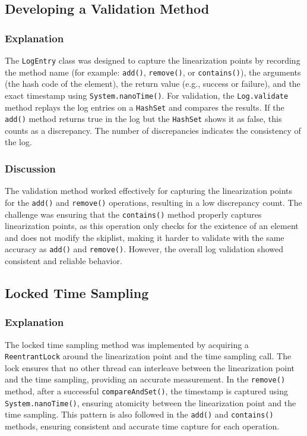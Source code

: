 \documentclass{article}
\begin{document}
\newpage
\subsection{Developing a Validation Method}

\subsubsection{Explanation}
The \texttt{LogEntry} class was designed to capture the linearization points by recording the method name (for example: \texttt{add()}, \texttt{remove()}, or \texttt{contains()}), the arguments (the hash code of the element), the return value (e.g., success or failure), and the exact timestamp using \texttt{System.nanoTime()}. For validation, the \texttt{Log.validate} method replays the log entries on a \texttt{HashSet} and compares the results. If the \texttt{add()} method returns true in the log but the \texttt{HashSet} shows it as false, this counts as a discrepancy. The number of discrepancies indicates the consistency of the log.

\subsubsection{Discussion}
The validation method worked effectively for capturing the linearization points for the \texttt{add()} and \texttt{remove()} operations, resulting in a low discrepancy count. The challenge was ensuring that the \texttt{contains()} method properly captures linearization points, as this operation only checks for the existence of an element and does not modify the skiplist, making it harder to validate with the same accuracy as \texttt{add()} and \texttt{remove()}. However, the overall log validation showed consistent and reliable behavior.

\newpage
\subsection{Locked Time Sampling}

\subsubsection{Explanation}
The locked time sampling method was implemented by acquiring a \texttt{ReentrantLock} around the linearization point and the time sampling call. The lock ensures that no other thread can interleave between the linearization point and the time sampling, providing an accurate measurement. In the \texttt{remove()} method, after a successful \texttt{compareAndSet()}, the timestamp is captured using \texttt{System.nanoTime()}, ensuring atomicity between the linearization point and the time sampling. This pattern is also followed in the \texttt{add()} and \texttt{contains()} methods, ensuring consistent and accurate time capture for each operation.
\end{document}
